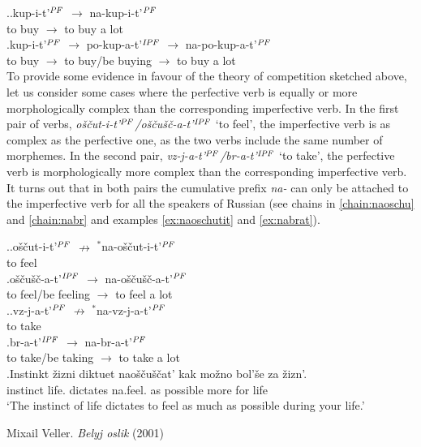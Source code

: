 \ex.\ag.\label{chain:nakupit}kup-i-t'$^{\mathit{PF}}$ $\rightarrow$ na-kup-i-t'$^{\mathit{PF}}$\\
{to buy} $\rightarrow$ {to buy a lot}\\
\bg.\label{chain:napokupat}kup-i-t'$^{\mathit{PF}}$ $\rightarrow$ po-kup-a-t'$^{\mathit{IPF}}$ $\rightarrow$ na-po-kup-a-t'$^{\mathit{PF}}$\\
{to buy} $\rightarrow$ {to buy/be buying} $\rightarrow$ {to buy a lot}\\

To provide some evidence in favour of the theory of competition sketched above, let us consider some cases where the perfective verb is equally or more morphologically complex than the corresponding imperfective verb. In the first pair of verbs, \textit{o\v{s}\v{c}ut-i-t'$^{\mathit{PF}}$/o\v{s}\v{c}u\v{s}\v{c}-a-t'$^{\mathit{IPF}}$} `to feel', the imperfective verb is as complex as the perfective one, as the two verbs include the same number of morphemes. In the second pair, \textit{vz-j-a-t'$^{\mathit{PF}}$/br-a-t'$^{\mathit{IPF}}$} `to take', the perfective verb is morphologically more complex than the corresponding imperfective verb. It turns out that in both pairs the cumulative prefix \textit{na-} can only be attached to the imperfective verb for all the speakers of Russian (see chains in \ref{chain:naoschu} and \ref{chain:nabr} and examples \ref{ex:naoschutit} and \ref{ex:nabrat}). 

\ex.\label{chain:naoschu}\ag.o\v{s}\v{c}ut-i-t'$^{\mathit{PF}}$ $\nrightarrow$ $^*$na-o\v{s}\v{c}ut-i-t'$^{\mathit{PF}}$\label{chain:oschutit}\\
{to feel} {} {}\\
\bg.\label{chain:oschuschat}o\v{s}\v{c}u\v{s}\v{c}-a-t'$^{\mathit{IPF}}$ $\rightarrow$ na-o\v{s}\v{c}u\v{s}\v{c}-a-t'$^{\mathit{PF}}$\\
{to feel/be feeling} $\rightarrow$ {to feel a lot}\\

\ex.\label{chain:nabr}\ag.vz-j-a-t'$^{\mathit{PF}}$ $\nrightarrow$ $^*$na-vz-j-a-t'$^{\mathit{PF}}$\label{chain:navzjat}\\
{to take} {} {}\\
\bg.\label{chain:nabrat}br-a-t'$^{\mathit{IPF}}$ $\rightarrow$ na-br-a-t'$^{\mathit{PF}}$\\
{to take/be taking} $\rightarrow$ {to take a lot}\\

\exg.\label{ex:naoschutit}Instinkt \v{z}izni diktuet nao\v{s}\v{c}u\v{s}\v{c}at' kak mo\v{z}no bol'\v{s}e za \v{z}izn'.\\
instinct life. dictates na.feel. as possible more for life\\
\vspace{0.5em}
`The instinct of life dictates to feel as much as possible during your life.'
\begin{flushright}
\vspace{-0.5em}
Mixail Veller. \textit{Belyj oslik} (2001)
\end{flushright}

